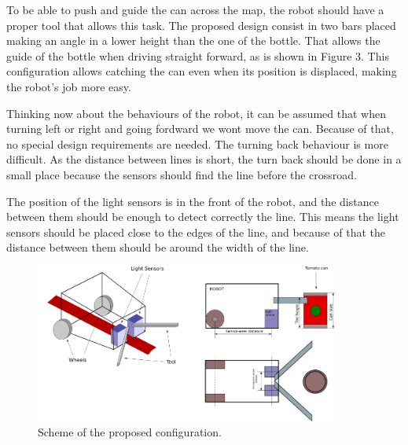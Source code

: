 \documentclass[12pt,a4paper]{article}
\begin{document}
To be able to push and guide the can across the map, the robot should have a proper tool that allows this task. 
The proposed design consist in two bars placed making an angle in a lower height than the one of the bottle. That allows the guide of the bottle when driving straight forward, as is shown in Figure 3. This configuration allows catching the can even when its position is displaced, making the robot's job more easy.

Thinking now about the behaviours of the robot, it can be assumed that when turning left or right and going fordward we wont move the can. Because of that, no special design requirements are needed. The turning back behaviour is more difficult. As the distance between lines is short, the turn back should be done in a small place because the sensors should find the line before the crossroad.

The position of the light sensors is in the front of the robot, and the distance between them should be enough to detect correctly the line. This means the light sensors should be placed close to the edges of the line, and because of that the distance between them should be around the width of the line.



\begin{figure}[T]
\includegraphics[width=10cm]{Fig2.png}
\centering
\caption{Scheme of the proposed configuration.}
\end{figure}

\end{document}
